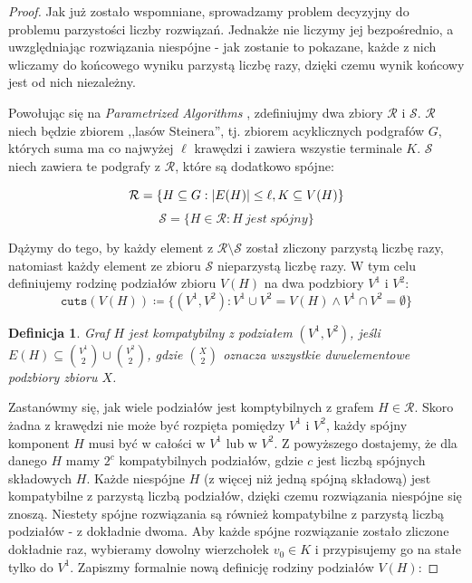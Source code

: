 \documentclass[12pt, oneside]{report}
\newtheorem{definition}{Definicja}
\begin{document}
\begin{proof}
Jak już zostało wspomniane, sprowadzamy problem decyzyjny do problemu parzystości liczby rozwiązań. Jednakże nie liczymy jej bezpośrednio, a uwzględniając rozwiązania niespójne - jak zostanie to pokazane, każde z nich wliczamy do końcowego wyniku parzystą liczbę razy, dzięki czemu wynik końcowy jest od nich niezależny.

Powołując się na \emph{Parametrized Algorithms} \cite{parametrized_algorithms}, zdefiniujmy dwa zbiory $\mathcal{R}$ i $\mathcal{S}$. $\mathcal{R}$ niech będzie zbiorem ,,lasów Steinera'', tj. zbiorem acyklicznych podgrafów $G$, których suma ma co najwyżej $\ell$ krawędzi i zawiera wszystie terminale $K$. $\mathcal{S}$ niech zawiera te podgrafy z $\mathcal{R}$, które są dodatkowo spójne:

$$\mathcal{R} = \{H \subseteq G: \abs{E(H)} \leq \ell, K \subseteq V(H)\}$$
$$\mathcal{S} = \{H \in \mathcal{R}: H\ jest\ sp\mbox{ó}jny\}$$

Dążymy do tego, by każdy element z $\mathcal{R} \setminus \mathcal{S}$ został zliczony parzystą liczbę razy, natomiast każdy element ze zbioru $\mathcal{S}$ nieparzystą liczbę razy. W tym celu definiujemy rodzinę podziałów zbioru $V(H)$ na dwa podzbiory $V^1$ i $V^2$:
$$\texttt{cuts} (V(H)) \coloneqq \{(V^1, V^2): V^1 \cup V^2 = V(H) \wedge V^1 \cap V^2 = \emptyset\}$$
\begin{definition}
\em \emph{Graf $H$ jest kompatybilny z podziałem $(V^1, V^2)$}, jeśli $E(H) \subseteq {V^1 \choose 2} \cup {V^2 \choose 2}$, gdzie ${X \choose 2}$ oznacza wszystkie dwuelementowe podzbiory zbioru $X$.  
\end{definition}

Zastanówmy się, jak wiele podziałów jest komptybilnych z grafem $H \in \mathcal{R}$. Skoro żadna z krawędzi nie może być rozpięta pomiędzy $V^1$ i $V^2$, każdy spójny komponent $H$ musi być w całości w $V^1$ lub w $V^2$. Z powyższego dostajemy, że dla danego $H$ mamy $2^c$ kompatybilnych podziałów, gdzie $c$ jest liczbą spójnych składowych $H$. Każde niespójne $H$ (z więcej niż jedną spójną składową) jest kompatybilne z parzystą liczbą podziałów, dzięki czemu rozwiązania niespójne się znoszą. Niestety spójne rozwiązania są również kompatybilne z parzystą liczbą podziałów - z dokładnie dwoma. Aby każde spójne rozwiązanie zostało zliczone dokładnie raz, wybieramy dowolny wierzchołek $v_0 \in K$ i przypisujemy go na stałe tylko do $V^1$. Zapiszmy formalnie nową definicję rodziny podziałów $V(H)$:


\end{proof}
\end{document}
